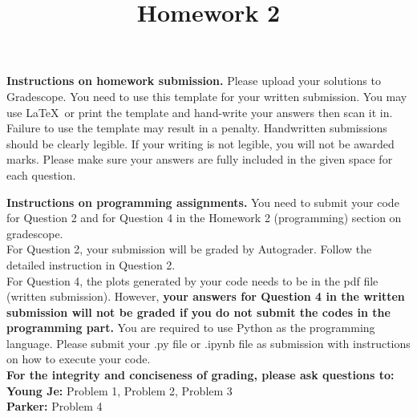 \documentclass[11pt]{article}
\begin{document}

\title{Homework 2}
\date{}
\maketitle


\noindent
{\bf Instructions on homework submission.} Please upload your solutions 
to Gradescope. You need to use this template for your written submission. You may use \LaTeX\ or print the template and hand-write your answers then scan it in. Failure to use the template may result in a penalty. Handwritten submissions should be clearly legible. If your writing is not legible, you will not be awarded marks. Please make sure your answers are fully included in the given space for each question.


\noindent
{\bf Instructions on programming assignments.} You need to submit your code for Question 2 and for Question 4 in the Homework 2 (programming) section on gradescope.\\
For Question 2, your submission will be graded by Autograder. Follow the detailed instruction in Question 2.\\
For Question 4, the plots generated by your code needs to be in the pdf file (written submission). However, \textbf{your answers for Question 4 in the written submission will not be graded if you do not submit the codes in the programming part.} You are required to use Python as the programming language. Please submit your .py file or .ipynb file as submission with instructions on how to execute your code.\\
\textbf{For the integrity and conciseness of grading, please ask questions to:}\\
\textbf{Young Je:} Problem 1, Problem 2, Problem 3\\
\textbf{Parker:} Problem 4\\
\end{document}
